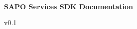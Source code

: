 \frontmatter

\begin{titlepage}
	\begin{center}
		
		
		 \\[2cm] 
		
		
		\centering \huge{\textbf{SAPO Services SDK Documentation}} \\ [1.5cm]
		
		\vspace*{\fill} 
		
		
		
		v0.1
		
	\end{center}	
\end{titlepage}

\cleardoublepage
\newpage


\cleardoublepage
\newpage

	\setlength{\parskip}{1ex plus 0.5ex minus 0.2ex}
	\setlength{\parindent}{0pt}

\tableofcontents

\listoffigures

\listoftables

\lstlistoflistings